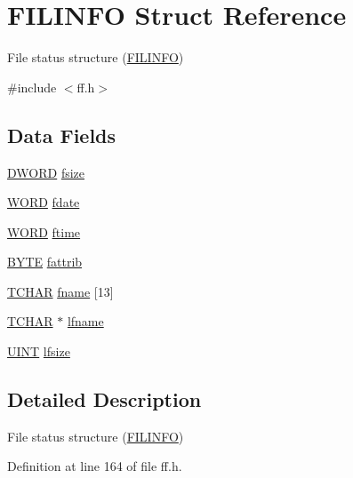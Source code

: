 \hypertarget{structFILINFO}{\section{F\-I\-L\-I\-N\-F\-O Struct Reference}
\label{structFILINFO}
}


File status structure (\hyperlink{structFILINFO}{F\-I\-L\-I\-N\-F\-O})  




{\ttfamily \#include $<$ff.\-h$>$}

\subsection*{Data Fields}
\begin{DoxyCompactItemize}
\item 
\hyperlink{integer_8h_ad342ac907eb044443153a22f964bf0af}{D\-W\-O\-R\-D} \hyperlink{structFILINFO_aee7441af7dc0c443d1e1e6011cc7dcac}{fsize}
\item 
\hyperlink{integer_8h_a197942eefa7db30960ae396d68339b97}{W\-O\-R\-D} \hyperlink{structFILINFO_a7c01c48a15b1b49da459924437b0bd52}{fdate}
\item 
\hyperlink{integer_8h_a197942eefa7db30960ae396d68339b97}{W\-O\-R\-D} \hyperlink{structFILINFO_ae0f751b79621bf7b29669f177bbe6b9a}{ftime}
\item 
\hyperlink{integer_8h_a4ae1dab0fb4b072a66584546209e7d58}{B\-Y\-T\-E} \hyperlink{structFILINFO_a838d542585831b085537b363f18205c0}{fattrib}
\item 
\hyperlink{ff_8h_a03bdb8ce5895c7e261aadc2529637546}{T\-C\-H\-A\-R} \hyperlink{structFILINFO_abd852510f2f79b4ec773156d8942dc7c}{fname} \mbox{[}13\mbox{]}
\item 
\hyperlink{ff_8h_a03bdb8ce5895c7e261aadc2529637546}{T\-C\-H\-A\-R} $\ast$ \hyperlink{structFILINFO_ac4506c29e0219130dff46b01a1b5c023}{lfname}
\item 
\hyperlink{integer_8h_a36cb3b01d81ffd844bbbfb54003e06ec}{U\-I\-N\-T} \hyperlink{structFILINFO_a2527c511ff4d12d285dbf3c4b3c9fb7b}{lfsize}
\end{DoxyCompactItemize}


\subsection{Detailed Description}
File status structure (\hyperlink{structFILINFO}{F\-I\-L\-I\-N\-F\-O}) 

Definition at line 164 of file ff.\-h.



